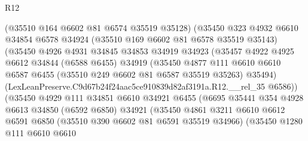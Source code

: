 \begin{lexlean}{R12}
\begin{coremodule}
                          (@35510 @164 @6602 @81 @6574 @35519 @35128)
                          (@35450
                            @323
                            @4932
                            @6610
                            @34854
                            @6578
                            @34924
                            (@35510 @169 @6602 @81 @6578 @35519 @35143)
                            (@35450
                              @4926
                              @4931
                              @34845
                              @34853
                              @34919
                              @34923
                              (@35457
                                @4922
                                @4925
                                @6612
                                @34844
                                (@6588 @6455)
                                @34919
                                (@35450
                                  @4877
                                  @111
                                  @6610
                                  @6610
                                  @6587
                                  @6455
                                  (@35510 @249 @6602 @81 @6587 @35519 @35263)
                                  @35494)
                                (LexLeanPreserve.C9d67b24f24aac5ce910839d82af3191a.R12.__rel_35
                                  @6586))
                              (@35450
                                @4929
                                @111
                                @34851
                                @6610
                                @34921
                                @6455
                                (@6695
                                  @35441
                                  @354
                                  @4928
                                  @6613
                                  @34850
                                  (@6592 @6850)
                                  @34921
                                  (@35450
                                    @4861
                                    @3211
                                    @6610
                                    @6612
                                    @6591
                                    @6850
                                    (@35510 @390 @6602 @81 @6591 @35519 @34966)
                                    (@35450
                                      @1280
                                      @111
                                      @6610
                                      @6610

\end{coremodule}
\end{lexlean}
